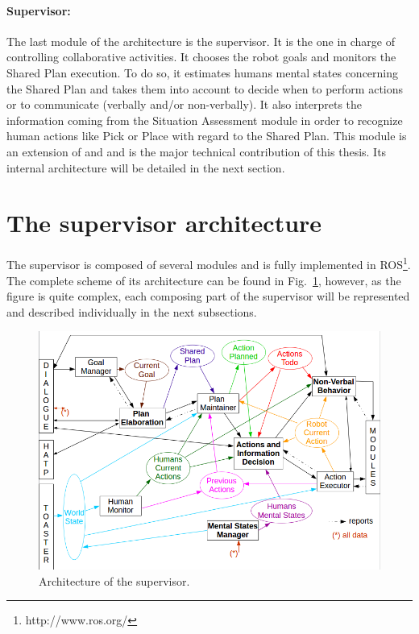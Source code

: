\documentclass[english,a4paper,11pt,twoside]{StyleThese}
\begin{document}
\paragraph{Supervisor:}
The last module of the architecture is the supervisor. It is the one in charge of controlling collaborative activities. It chooses the robot goals and monitors the Shared Plan execution. To do so, it estimates humans mental states concerning the Shared Plan and takes them into account to decide when to perform actions or to communicate (verbally and/or non-verbally). It also interprets the information coming from the Situation Assessment module in order to recognize human actions like Pick or Place with regard to the Shared Plan. This module is an extension of \cite{clodic2009shary} and \cite{fiore2016planning} and is the major technical contribution of this thesis. Its internal architecture will be detailed in the next section.

\newpage
\section{The supervisor architecture}

The supervisor is composed of several modules and is fully implemented in ROS\footnote{http://www.ros.org/}. The complete scheme of its architecture can be found in Fig.~\ref{fig:archiSup}, however, as the figure is quite complex, each composing part of the supervisor will be represented and described individually in the next subsections. 

\begin{figure}[!h]
	\centering
    \includegraphics[width=\textwidth]{figs/Chapter2/ArchiSup.png}
    \caption{Architecture of the supervisor.}
    \label{fig:archiSup}
\end{figure}
\end{document}
